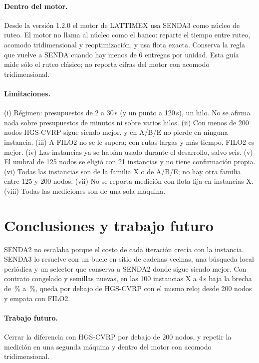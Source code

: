 \documentclass[11pt,a4paper]{article}
\newcommand{\senda}{SENDA}
\newcommand{\sendados}{SENDA2}
\newcommand{\sendatres}{SENDA3}
\begin{document}
\paragraph{Dentro del motor.} Desde la versión 1.2.0 el motor de LATTIMEX usa \sendatres{} como núcleo
de ruteo. El motor no llama al núcleo como el banco: reparte el tiempo entre ruteo, acomodo
tridimensional y reoptimización, y usa flota exacta. Conserva la regla que vuelve a \senda{} cuando hay
menos de 6 entregas por unidad. Esta guía mide sólo el ruteo clásico; no reporta cifras del motor con
acomodo tridimensional.

\paragraph{Limitaciones.}
(i) Régimen: presupuestos de 2 a 30\,s (y un punto a 120\,s), un hilo. No se afirma nada sobre
presupuestos de minutos ni sobre varios hilos.
(ii) Con menos de 200 nodos HGS-CVRP sigue siendo mejor, y en A/B/E no pierde en ninguna instancia.
(iii) A FILO2 no se le supera; con rutas largas y más tiempo, FILO2 es mejor.
(iv) Las instancias ya se habían usado durante el desarrollo, salvo seis.
(v) El umbral de 125 nodos se eligió con 21 instancias y no tiene confirmación propia.
(vi) Todas las instancias son de la familia X o de A/B/E; no hay otra familia entre 125 y 200 nodos.
(vii) No se reporta medición con flota fija en instancias X.
(viii) Todas las mediciones son de una sola máquina.

\section{Conclusiones y trabajo futuro}

\sendados{} no escalaba porque el costo de cada iteración crecía con la instancia. \sendatres{} lo
resuelve con un bucle en sitio de cadenas vecinas, una búsqueda local periódica y un selector que
conserva a \sendados{} donde sigue siendo mejor. Con contrato congelado y semillas nuevas, en las 100
instancias X a 4\,s baja la brecha de \DosX\,\% a \TresX\,\%, queda por debajo de HGS-CVRP con el mismo
reloj desde 200 nodos y empata con FILO2.

\paragraph{Trabajo futuro.} Cerrar la diferencia con HGS-CVRP por debajo de 200 nodos, y repetir la
medición en una segunda máquina y dentro del motor con acomodo tridimensional.
\end{document}
